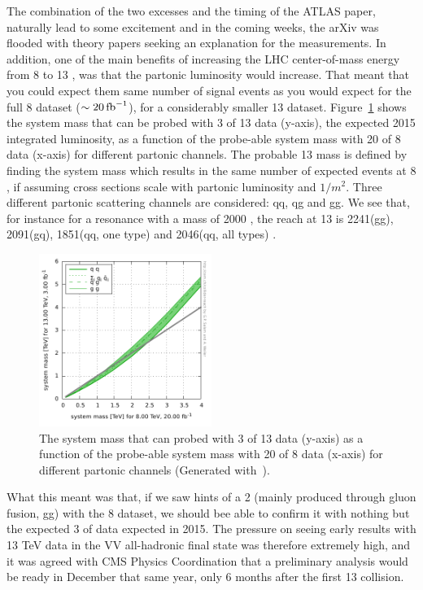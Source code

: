 The combination of the two excesses and the timing of the ATLAS paper, naturally lead to some excitement and in the coming weeks, the arXiv was flooded with theory papers seeking an explanation for the measurements.\newline
In addition, one of the main benefits of increasing the LHC center-of-mass energy from 8 to 13 \TeV, was that the partonic luminosity would increase.
That meant that you could expect them same number of signal events as you would expect for the full 8 \TeV dataset ($\sim 20 \mbox{\ensuremath{\,\text{fb}^\text{$-$1}}}$), for a considerably smaller 13 \TeV dataset. Figure~\ref{fig:searchI:8vs13reach} shows the system mass that can be probed with 3 \fbinv of 13 \TeV data (y-axis), the expected 2015 integrated luminosity, as a function of the probe-able system mass with 20 \fbinv of 8 \TeV data (x-axis) for different partonic channels. The probable 13 \TeV mass is defined by finding the system mass which results in the same number of expected events at 8 \TeV, if assuming cross sections scale with partonic luminosity and $1/m^2$. Three different partonic scattering channels are considered: qq, qg and gg. We see that, for instance for a resonance with a mass of 2000 \GeV, the reach at 13 \TeV is 2241(gg), 2091(gq), 1851(qq, one type) and 2046(qq, all types) \GeV.

\begin{figure}[ht] 
    \centering
    \includegraphics[width=0.50\textwidth]{figures/analysis/search1/misc/colliderReach.png}
    \caption{The system mass that can probed with 3 \fbinv of 13 \TeV data (y-axis) as a function of the probe-able system mass with 20 \fbinv of 8 \TeV data (x-axis) for different partonic channels (Generated with~\cite{collreach}).}
    \label{fig:searchI:8vs13reach}
\end{figure}

What this meant was that, if we saw hints of a 2 \TeV \BulkG (mainly produced through gluon fusion, gg) with the 8 \TeV dataset, we should bee able to confirm it with nothing but the expected 3 \fbinv of data expected in 2015.
The pressure on seeing early results with 13 TeV data in the VV all-hadronic final state was therefore extremely high, and it was agreed with CMS Physics Coordination that a preliminary analysis would be ready in December that same year, only 6 months after the first 13 \TeV collision.

